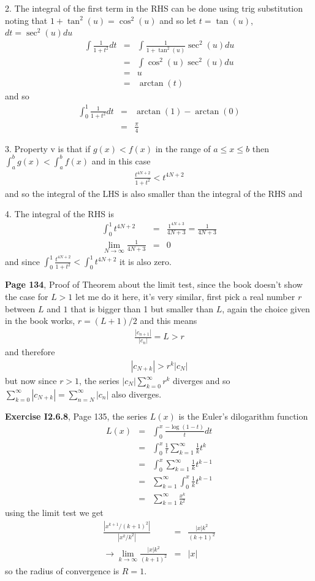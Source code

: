\documentclass[aps,preprint,preprintnumbers,nofootinbib,showpacs,prd]{revtex4-1}
\newcommand{\nbea}{\begin{eqnarray*}}
\newcommand{\neea}{\end{eqnarray*}}
\begin{document}
2. The integral of the first term in the RHS can be done using trig substitution noting that $1+\tan^2(u) = \cos^2(u)$ and so let $t=\tan(u)$, $dt = \sec^2(u)du$
%
\nbea
\int \frac{1}{1+t^2} dt & = & \int \frac{1}{1+\tan^2(u)}\sec^2(u)du \\
& = & \int \cos^2(u)\sec^2(u) du \\
& = & u \\
& = &\arctan(t)
\neea
%
and so
%
\nbea
\int_0^1 \frac{1}{1+t^2} dt & = & \arctan(1) - \arctan(0) \\
& = & \frac{\pi}{4}
\neea
%

3. Property v is that if $g(x) < f(x)$ in the range of $a \le x \le b$ then $\int_a^b g(x) < \int_a^b f(x)$ and in this case
%
\nbea
\frac{t^{4N+2}}{1+t^2} < t^{4N+2}
\neea
%
and so the integral of the LHS is also smaller than the integral of the RHS and

4. The integral of the RHS is
%
\nbea
\int_0^1 t^{4N+2} & = & \frac{1^{4N+3}}{4N+3} = \frac{1}{4N+3} \\
\lim_{N\to\infty} \frac{1}{4N+3} & = & 0
\neea
%
and since $\int_0^1\frac{t^{4N+2}}{1+t^2} < \int_0^1 t^{4N+2}$ it is also zero.

{\bf Page 134}, Proof of Theorem about the limit test, since the book doesn't show the case for $L>1$ let me do it here, it's very similar, first pick a real number $r$ between $L$ and $1$ that is bigger than 1 but smaller than $L$, again the choice given in the book works, $r = (L+1)/2$ and this means
%
\nbea
\frac{|c_{n+1}|}{|c_n|} = L > r
\neea
%
and therefore
%
\nbea
|c_{N+k}| > r^k|c_N|
\neea
%
but now since $r > 1$, the series $|c_N|\sum_{k=0}^\infty r^k$ diverges and so $\sum_{k=0}^\infty |c_{N+k}|=\sum_{n=N}^\infty|c_n|$ also diverges.

{\bf Exercise I2.6.8}, Page 135, the series $L(x)$ is the Euler's dilogarithm function
%
\nbea
L(x) & = & \int_0^x \frac{-\log(1-t)}{t} dt \\
& = & \int_0^x \frac{1}{t}\sum_{k=1}^\infty \frac{1}{k} t^k \\
& = & \int_0^x \sum_{k=1}^\infty \frac{1}{k} t^{k-1} \\
& = & \sum_{k=1}^\infty \int_0^x \frac{1}{k} t^{k-1} \\
& = & \sum_{k=1}^\infty\frac{x^k}{k^2}
\neea
%
using the limit test we get
%
\nbea
\frac{|x^{k+1}/(k+1)^2|}{|x^k/k^2|} & = & \frac{|x|k^2}{(k+1)^2} \\
\to \lim_{k\to\infty} \frac{|x|k^2}{(k+1)^2} & = & |x|
\neea
%
so the radius of convergence is $R=1$.
\end{document}
